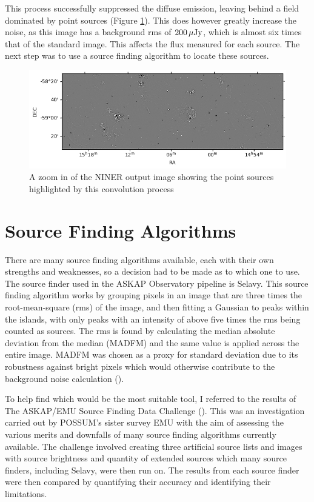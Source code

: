 This process successfully suppressed the diffuse emission, leaving behind a field dominated by point sources (Figure \ref{fig: niner}). This does however greatly increase the noise, as this image has a background rms of $200 \,\mu{\rm Jy}$, which is almost six times that of the standard image. This affects the flux measured for each source. The next step was to use a source finding algorithm to locate these sources.


\begin{figure}
    \centering
    \includegraphics[width=1\linewidth]{Thesis_Template/Figures/niner.png}
    \caption{A zoom in of the NINER output image showing the point sources highlighted by this convolution process}
    \label{fig: niner}
\end{figure}



\section{Source Finding Algorithms}

There are many source finding algorithms available, each with their own strengths and weaknesses, so a decision had to be made as to which one to use. The source finder used in the ASKAP Observatory pipeline is Selavy. This source finding algorithm works by grouping pixels in an image that are three times the root-mean-square (rms) of the image, and then fitting a Gaussian to peaks within the islands, with only peaks with an intensity of above five times the rms being counted as sources. The rms is found by calculating the median absolute deviation from the median (MADFM) and the same value is applied across the entire image. MADFM was chosen as a proxy for standard deviation due to its robustness against bright pixels which would otherwise contribute to the background noise calculation (\cite{Duchamp_Whiting_2012}). 

To help find which would be the most suitable tool, I referred to the results of The ASKAP/EMU Source Finding Data Challenge (\cite{data_challenge}). This was an investigation carried out by POSSUM's sister survey EMU with the aim of assessing the various merits and downfalls of many source finding algorithms currently available. The challenge involved creating three artificial source lists and images with source brightness and quantity of extended sources which many source finders, including Selavy, were then run on. The results from each source finder were then compared by quantifying their accuracy and identifying their limitations. 

